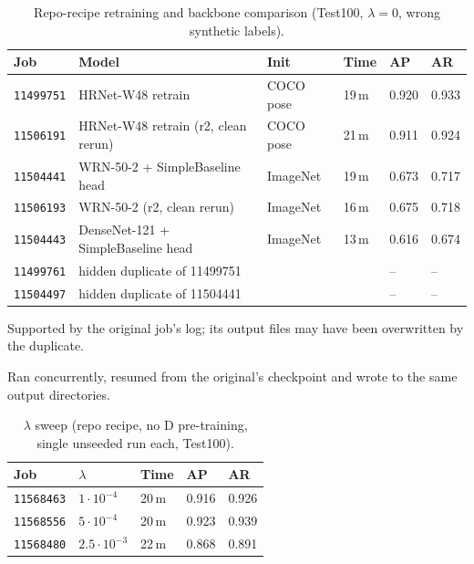 \documentclass[10pt]{article}
\newcommand{\job}[1]{\texttt{#1}}
\newcommand{\na}{--}
\begin{document}
\begin{table}[h]\centering\small
\begin{threeparttable}
\caption{Repo-recipe retraining and backbone comparison (Test100, $\lambda=0$, wrong synthetic labels).}
\begin{tabularx}{\linewidth}{l X l l l l}
\toprule
Job & Model & Init & Time & AP & AR \\
\midrule
\job{11499751} & HRNet-W48 retrain & COCO pose & 19\,m & 0.920\tnote{a} & 0.933 \\
\job{11506191} & HRNet-W48 retrain (r2, clean rerun) & COCO pose & 21\,m & 0.911 & 0.924 \\
\job{11504441} & WRN-50-2 + SimpleBaseline head & ImageNet & 19\,m & 0.673\tnote{a} & 0.717 \\
\job{11506193} & WRN-50-2 (r2, clean rerun) & ImageNet & 16\,m & 0.675 & 0.718 \\
\job{11504443} & DenseNet-121 + SimpleBaseline head & ImageNet & 13\,m & 0.616 & 0.674 \\
\midrule
\job{11499761} & hidden duplicate of 11499751\tnote{b} & & & \na & \na \\
\job{11504497} & hidden duplicate of 11504441\tnote{b} & & & \na & \na \\
\bottomrule
\end{tabularx}
\begin{tablenotes}\footnotesize
\item[a] Supported by the original job's log; its output files may have been overwritten by the duplicate.
\item[b] Ran concurrently, resumed from the original's checkpoint and wrote to the same output directories.
\end{tablenotes}
\end{threeparttable}
\end{table}

\begin{table}[h]\centering\small
\caption{$\lambda$ sweep (repo recipe, no D pre-training, single unseeded run each, Test100).}
\begin{tabular}{lllll}
\toprule
Job & $\lambda$ & Time & AP & AR \\
\midrule
\job{11568463} & $1\cdot10^{-4}$ & 20\,m & 0.916 & 0.926 \\
\job{11568556} & $5\cdot10^{-4}$ & 20\,m & 0.923 & 0.939 \\
\job{11568480} & $2.5\cdot10^{-3}$ & 22\,m & 0.868 & 0.891 \\
\bottomrule
\end{tabular}
\end{table}
\end{document}
